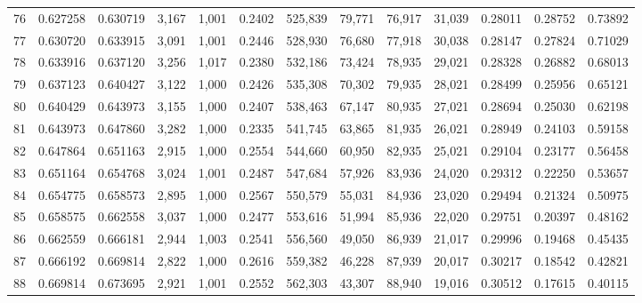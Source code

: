 \begin{tabular}{rrrrrrrrrrrrr}
76  &  0.627258 &  0.630719 &   3,167 &  1,001 &                                     0.2402 &  525,839 &   79,771 &   76,917 &   31,039 &  0.28011 &  0.28752 &  0.73892 \\
77  &  0.630720 &  0.633915 &   3,091 &  1,001 &                                     0.2446 &  528,930 &   76,680 &   77,918 &   30,038 &  0.28147 &  0.27824 &  0.71029 \\
78  &  0.633916 &  0.637120 &   3,256 &  1,017 &                                     0.2380 &  532,186 &   73,424 &   78,935 &   29,021 &  0.28328 &  0.26882 &  0.68013 \\
79  &  0.637123 &  0.640427 &   3,122 &  1,000 &                                     0.2426 &  535,308 &   70,302 &   79,935 &   28,021 &  0.28499 &  0.25956 &  0.65121 \\
80  &  0.640429 &  0.643973 &   3,155 &  1,000 &                                     0.2407 &  538,463 &   67,147 &   80,935 &   27,021 &  0.28694 &  0.25030 &  0.62198 \\
81  &  0.643973 &  0.647860 &   3,282 &  1,000 &                                     0.2335 &  541,745 &   63,865 &   81,935 &   26,021 &  0.28949 &  0.24103 &  0.59158 \\
82  &  0.647864 &  0.651163 &   2,915 &  1,000 &                                     0.2554 &  544,660 &   60,950 &   82,935 &   25,021 &  0.29104 &  0.23177 &  0.56458 \\
83  &  0.651164 &  0.654768 &   3,024 &  1,001 &                                     0.2487 &  547,684 &   57,926 &   83,936 &   24,020 &  0.29312 &  0.22250 &  0.53657 \\
84  &  0.654775 &  0.658573 &   2,895 &  1,000 &                                     0.2567 &  550,579 &   55,031 &   84,936 &   23,020 &  0.29494 &  0.21324 &  0.50975 \\
85  &  0.658575 &  0.662558 &   3,037 &  1,000 &                                     0.2477 &  553,616 &   51,994 &   85,936 &   22,020 &  0.29751 &  0.20397 &  0.48162 \\
86  &  0.662559 &  0.666181 &   2,944 &  1,003 &                                     0.2541 &  556,560 &   49,050 &   86,939 &   21,017 &  0.29996 &  0.19468 &  0.45435 \\
87  &  0.666192 &  0.669814 &   2,822 &  1,000 &                                     0.2616 &  559,382 &   46,228 &   87,939 &   20,017 &  0.30217 &  0.18542 &  0.42821 \\
88  &  0.669814 &  0.673695 &   2,921 &  1,001 &                                     0.2552 &  562,303 &   43,307 &   88,940 &   19,016 &  0.30512 &  0.17615 &  0.40115 \\

\end{tabular}
